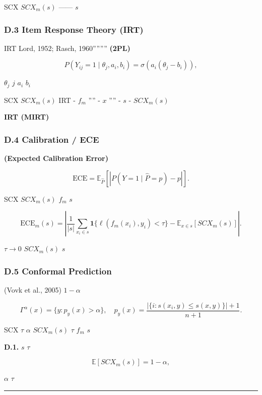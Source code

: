 \documentclass[
  12pt,
]{article}
\begin{document}
SCX  \(SCX_m(s)\)
\textbf{}------ \(s\)


\subsubsection{D.3 Item Response Theory
(IRT)}\label{d.3-item-response-theory-irt}

IRT Lord, 1952; Rasch,
1960''''''''\textbf{
(2PL)}

\[P(Y_{ij} = 1 \mid \theta_j, a_i, b_i) = \sigma(a_i(\theta_j - b_i)),\]

 \(\theta_j\)  \(j\) \(a_i\) \(b_i\)


SCX  \(SCX_m(s)\)  IRT  -  \(f_m\)
'''' -  \(x\) '''' -  \(s\)
 - \(SCX_m(s)\) 

\textbf{ IRT (MIRT)} 

\subsubsection{D.4  Calibration / ECE
}\label{d.4-ux4e0e-calibration-ece-ux7684ux5173ux7cfb}

\textbf{ (Expected Calibration Error)}

\[\text{ECE} = \mathbb{E}_{\hat{P}}[|P(Y = 1 \mid \hat{P} = p) - p|].\]

SCX  \(SCX_m(s)\)  \(f_m\)  \(s\)


\[\text{ECE}_m(s) = \left| \frac{1}{|s|} \sum_{x_i \in s} \mathbf{1}\{\ell(f_m(x_i), y_i) < \tau\} - \mathbb{E}_{x \in s}[SCX_m(s)] \right|.\]

 \(\tau \to 0\) \(SCX_m(s)\)  \(s\)


\subsubsection{D.5  Conformal Prediction
}\label{d.5-ux4e0e-conformal-prediction-ux7684ux5173ux7cfb}

\textbf{} (Vovk et al., 2005)  \(1-\alpha\)


\[\Gamma^\alpha(x) = \{y: p_y(x) > \alpha\}, \quad p_y(x) = \frac{|\{i: s(x_i, y) \leq s(x, y)\}| + 1}{n + 1}.\]

SCX  \(\tau\)  \(\alpha\)
\(SCX_m(s)\)  \(\tau\)
\(f_m\)  \(s\) 

\textbf{ D.1.}  \(s\)
 \(\tau\)

\[\mathbb{E}[SCX_m(s)] = 1 - \alpha,\]

 \(\alpha\)  \(\tau\) 

\begin{center}\rule{0.5\linewidth}{0.5pt}\end{center}
\end{document}
